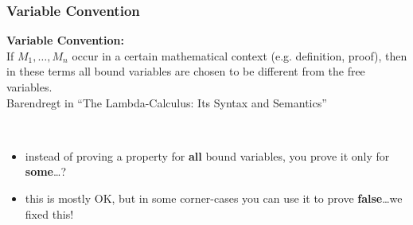 \documentclass[dvipsnames,14pt,t]{beamer}
\begin{document}
\begin{frame}[c]
\frametitle{\Large Variable Convention}

\begin{center}
\begin{bubble}[10cm]
  \color{gray}  
  \small
  {\bf\mbox{}Variable Convention:}\\[1mm] 
  If $M_1,\ldots,M_n$ occur in a certain mathematical context
  (e.g. definition, proof), then in these terms all bound variables 
  are chosen to be different from the free variables.\\[2mm]
  
  \footnotesize\hfill Barendregt in ``The Lambda-Calculus: Its Syntax and Semantics''
\end{bubble}
\end{center}

\mbox{}\\[-8mm]
\begin{itemize}


\item instead of proving a property for \alert{\bf all} bound
variables, you prove it only for \alert{\bf some}\ldots?

\item this is mostly OK, but in some corner-cases you can use it
to prove \alert{\bf false}\ldots we fixed this!
\end{itemize}

\end{frame}
\end{document}
